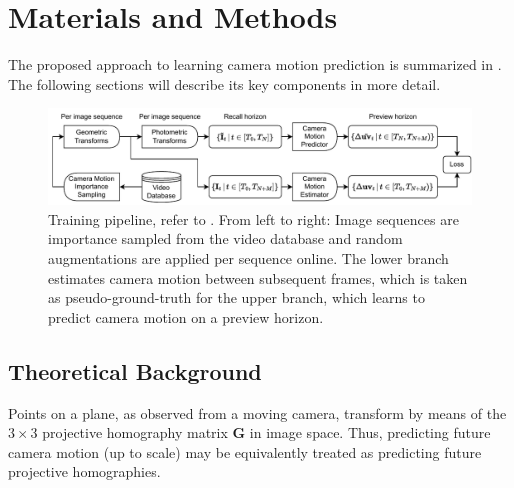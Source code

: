 

\section{Materials and Methods}
The proposed approach to learning camera motion prediction is summarized in . The following sections will describe its key components in more detail.

\begin{landscape}
\begin{figure}
\centering
\includegraphics[width=0.7\paperheight]{fig/23_02_13_miccai_figures.drawio.pdf}
\caption{Training pipeline, refer to  . From left to right: Image sequences are importance sampled from the video database and random augmentations are applied per sequence online. The lower branch estimates camera motion between subsequent frames, which is taken as pseudo-ground-truth for the upper branch, which learns to predict camera motion on a preview horizon.}
\label{c3:fig:training_pipeline}
\end{figure}
\end{landscape}


\subsection{Theoretical Background}
\label{c3:sec:theoretical_background}
Points on a plane, as observed from a moving camera, transform by means of the $3\times3$ projective homography matrix $\mathbf{G}$ in image space. Thus, predicting future camera motion (up to scale) may be equivalently treated as predicting future projective homographies.

